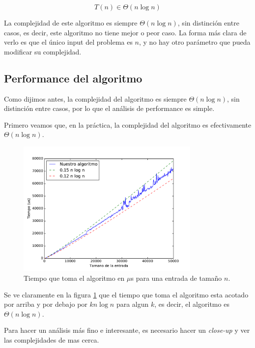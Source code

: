 \[T(n) \in \Theta(n \log n)\]

La complejidad de este algoritmo es siempre $\Theta(n \log n)$, sin distinción entre casos, es decir, este algoritmo no tiene mejor o peor caso. La forma más clara de verlo es que el único input del problema es $n$, y no hay otro parámetro que pueda modificar su complejidad.

\subsection{Performance del algoritmo}

Como dijimos antes, la complejidad del algoritmo es siempre $\Theta(n \log n)$, sin distinción entre casos, por lo que el análisis de performance es simple.

Primero veamos que, en la práctica, la complejidad del algoritmo es efectivamente $\Theta(n \log n)$.

\begin{figure}[H]
 \centering
	\includegraphics[width=0.8\textwidth]{img/tiempos/kaioken3.pdf}
	\caption{\footnotesize Tiempo que toma el algoritmo en $\mu$s para una entrada de tamaño $n$.}
	\label{fig:kaioken-tiempos3}
\end{figure}

Se ve claramente en la figura \ref{fig:kaioken-tiempos3} que el tiempo que toma el algoritmo esta acotado por arriba y por debajo por $k n \log n$ para algun $k$, es decir, el algoritmo es $\Theta(n \log n)$.

Para hacer un análisis más fino e interesante, es necesario hacer un \emph{close-up} y ver las complejidades de mas cerca.

